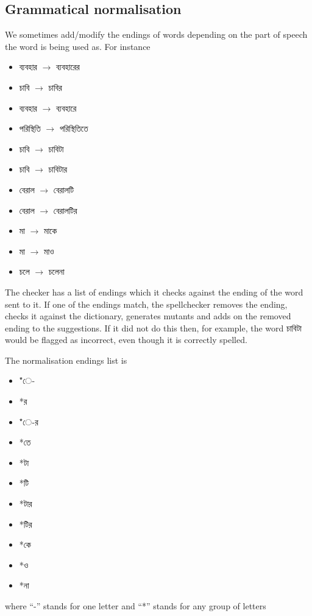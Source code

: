 \documentclass[11pt]{article}
\begin{document}
\subsection{Grammatical normalisation}
We sometimes add/modify the endings of words depending on the part of speech the word is being used as. For instance \begin{itemize}
\item {\lbng ব্যবহার} $\rightarrow$ {\lbng ব্যবহারের}
\item {\lbng চাবি} $\rightarrow$ {\lbng চাবির}
\item {\lbng ব্যবহার} $\rightarrow$ {\lbng ব্যবহারে}
\item {\lbng পরিস্থিতি} $\rightarrow$ {\lbng পরিস্থিতিতে}
\item {\lbng চাবি} $\rightarrow$ {\lbng চাবিটা}
\item {\lbng চাবি} $\rightarrow$ {\lbng চাবিটার}
\item {\lbng বেরাল} $\rightarrow$ {\lbng বেরালটি}
\item {\lbng বেরাল} $\rightarrow$ {\lbng বেরালটির}
\item {\lbng মা} $\rightarrow$ {\lbng মাকে}
\item {\lbng মা} $\rightarrow$ {\lbng মাও}
\item {\lbng চলে} $\rightarrow$ {\lbng চলেনা}
\end{itemize}
The checker has a list of endings which it checks against the ending of the word sent to it. If one of the endings match, the spellchecker removes the ending, checks it against the dictionary, generates mutants and adds on the removed ending to the suggestions. If it did not do this then, for example, the word {\bng চাবিটা} would be flagged as incorrect, even though it is correctly spelled.

\pagebreak
The normalisation endings list is
{\lbng 
\begin{itemize}
\item *ে-
\item *র
\item *ে-র
\item *তে
\item *টা
\item *টি
\item *টার
\item *টির
\item *কে
\item *ও
\item *না
\end{itemize}
}
where ``-'' stands for one letter and ``*'' stands for any group of letters
\end{document}

